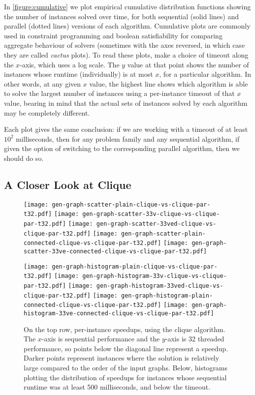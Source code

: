 \documentclass[sigconf]{acmart}
\begin{document}
In \cref{figure:cumulative} we plot empirical cumulative distribution functions showing the number
of instances solved over time, for both sequential (solid lines) and parallel (dotted lines)
versions of each algorithm.  Cumulative plots are commonly used in constraint programming and
boolean satisfiability for comparing aggregate behaviour of solvers (sometimes with the axes
reversed, in which case they are called \emph{cactus} plots).  To read these plots, make a choice of
timeout along the $x$-axis, which uses a log scale. The $y$ value at that point shows the number of
instances whose runtime (individually) is at most $x$, for a particular algorithm. In other words,
at any given $x$ value, the highest line shows which algorithm is able to solve the largest number
of instances using a per-instance timeout of that $x$ value, bearing in mind that the actual sets of
instances solved by each algorithm may be completely different.

Each plot gives the same conclusion: if we are working with a timeout of at least $10^2$
milliseconds, then for any problem family and any sequential algorithm, if given the option of
switching to the corresponding parallel algorithm, then we should do so.

\subsection{A Closer Look at Clique}

\begin{figure*}[tb]
    \texttt{[image: gen-graph-scatter-plain-clique-vs-clique-par-t32.pdf]}
    \hfill
    \texttt{[image: gen-graph-scatter-33v-clique-vs-clique-par-t32.pdf]}
    \hfill
    \texttt{[image: gen-graph-scatter-33ved-clique-vs-clique-par-t32.pdf]}
    \hfill
    \texttt{[image: gen-graph-scatter-plain-connected-clique-vs-clique-par-t32.pdf]}
    \hfill
    \texttt{[image: gen-graph-scatter-33ve-connected-clique-vs-clique-par-t32.pdf]}

    \vspace*{1em}

    \texttt{[image: gen-graph-histogram-plain-clique-vs-clique-par-t32.pdf]}
    \hfill
    \texttt{[image: gen-graph-histogram-33v-clique-vs-clique-par-t32.pdf]}
    \hfill
    \texttt{[image: gen-graph-histogram-33ved-clique-vs-clique-par-t32.pdf]}
    \hfill
    \texttt{[image: gen-graph-histogram-plain-connected-clique-vs-clique-par-t32.pdf]}
    \hfill
    \texttt{[image: gen-graph-histogram-33ve-connected-clique-vs-clique-par-t32.pdf]}

    \caption{On the top row, per-instance speedups, using the clique algorithm. The $x$-axis is
    sequential performance and the $y$-axis is 32 threaded performance, so points below the diagonal
    line represent a speedup. Darker points represent instances where the solution is relatively
    large compared to the order of the input graphs. Below, histograms plotting the distribution of
    speedups for instances whose sequential runtime was at least 500 milliseconds, and below the
    timeout.}
\end{figure*}
\end{document}
